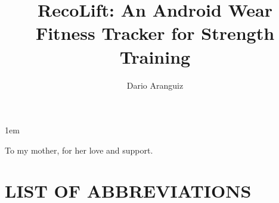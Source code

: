 \documentclass[tocnosub,noragright,centerchapter,12pt]{uiucecethesis09}
\title{RecoLift: An Android Wear Fitness Tracker for Strength Training}
\author{Dario Aranguiz}
\begin{document}
%

%
\maketitle

\parindent 1em%

\frontmatter

%
\begin{abstract}

\end{abstract}


%
\begin{dedication}
To my mother, for her love and support. 
\end{dedication}

%
\begin{acknowledgments}

\end{acknowledgments}

%
\tableofcontents

%

%

%
\chapter{LIST OF ABBREVIATIONS}
\end{document}
